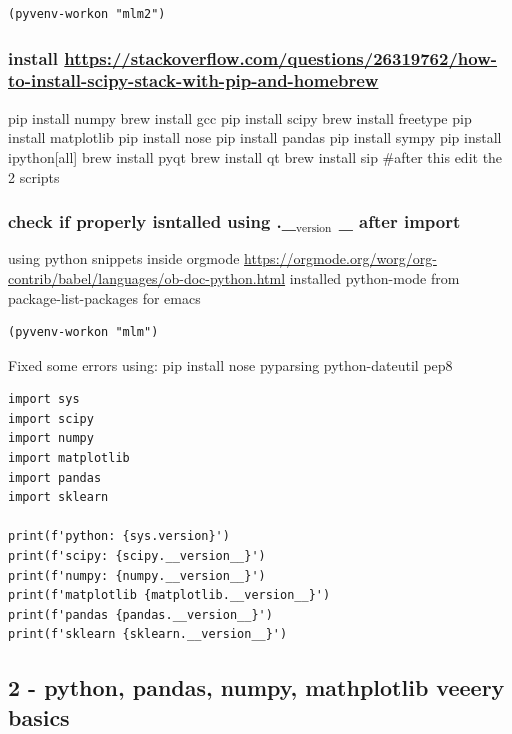 \documentclass[11pt]{article}
\begin{document}
\begin{verbatim}
(pyvenv-workon "mlm2")
\end{verbatim}

\subsubsection{install \url{https://stackoverflow.com/questions/26319762/how-to-install-scipy-stack-with-pip-and-homebrew}}
\label{sec:org9abf3a7}
pip install numpy
brew install gcc
pip install scipy
brew install freetype
pip install matplotlib
pip install nose
pip install pandas
pip install sympy
pip install ipython[all]
brew install pyqt
brew install qt
brew install sip
\#after this edit the 2 scripts
\subsubsection{check if properly isntalled using .\_\(_{\text{version}}\) \_ after import}
\label{sec:org3f444de}

using python snippets inside orgmode \url{https://orgmode.org/worg/org-contrib/babel/languages/ob-doc-python.html}
installed python-mode from package-list-packages for emacs
\begin{verbatim}
(pyvenv-workon "mlm")
\end{verbatim}

Fixed some errors using: pip install nose pyparsing python-dateutil pep8
\begin{verbatim}
import sys
import scipy
import numpy
import matplotlib
import pandas
import sklearn

print(f'python: {sys.version}')
print(f'scipy: {scipy.__version__}')
print(f'numpy: {numpy.__version__}')
print(f'matplotlib {matplotlib.__version__}')
print(f'pandas {pandas.__version__}')
print(f'sklearn {sklearn.__version__}')

\end{verbatim}

\subsection{2 - python, pandas, numpy, mathplotlib veeery basics}
\label{sec:orgb3e4198}
\end{document}
